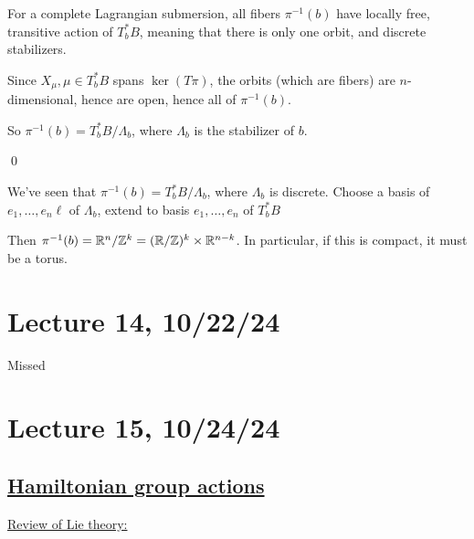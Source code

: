 \documentclass[x11names,reqno,14pt]{extarticle}
\begin{document}
For a complete Lagrangian submersion, all fibers $\pi^{-1}(b)$ have locally free, transitive action of $T_b^*B$, meaning that there is only one orbit, and discrete stabilizers. 

\proof

Since $X_\mu, \mu\in T_b^*B$ spans $\ker(T\pi)$, the orbits (which are fibers) are $n$-dimensional, hence are open, hence all of $\pi^{-1}(b). $

So $\pi^{-1}(b) = T_b^*B / \Lambda_b$, where $\Lambda_b$ is the stabilizer of $b$.

\qed

We've seen that $\pi^{-1}(b) = T^*_bB/\Lambda_b$, where $\Lambda_b$ is discrete. Choose a basis of $e_1, \dots, e_n\ell$ of $\Lambda_b$, extend to basis $e_1,\dots,e_n$ of $T_b^*B$

Then $\pi^{-1}(b) = \mathbb{R}^n/\mathbb{Z}^k = (\mathbb{R}/\mathbb{Z})^k\times\mathbb{R}^{n-k}$. In particular, if this is compact, it must be a torus.




\section*{Lecture 14, 10/22/24}

Missed

\section*{Lecture 15, 10/24/24}

\subsection*{\underline{Hamiltonian group actions}}

\underline{Review of Lie theory:}
\end{document}
